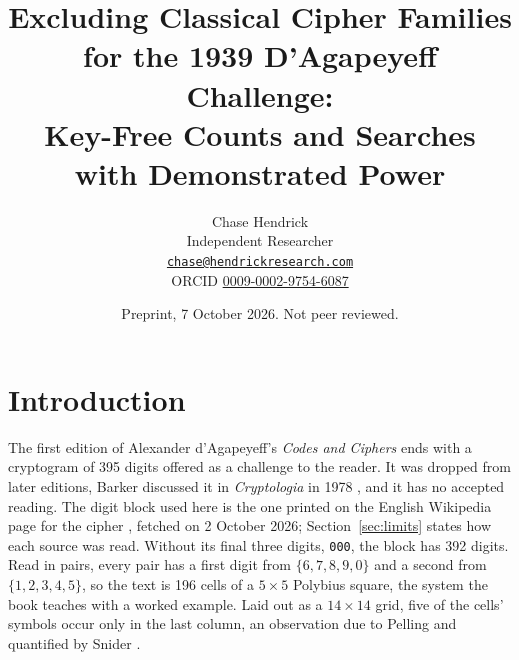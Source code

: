 \documentclass[11pt]{article}
\title{\Large\bfseries Excluding Classical Cipher Families\\ for the 1939 D'Agapeyeff Challenge:\\ Key-Free Counts and Searches with Demonstrated Power}
\author{Chase Hendrick\\[0.2em] {\small Independent Researcher}\\ {\small\href{mailto:chase@hendrickresearch.com}{\texttt{chase@hendrickresearch.com}}}\\ {\small ORCID \href{https://orcid.org/0009-0002-9754-6087}{0009-0002-9754-6087}}}
\date{\small Preprint, 7 October 2026. Not peer reviewed.}
\theoremstyle{definition}
\begin{document}
\maketitle

\begin{abstract}

\end{abstract}

\section{Introduction}\label{sec:intro}

The first edition of Alexander d'Agapeyeff's \emph{Codes and Ciphers} \cite{dagapeyeff1939} ends with a cryptogram of 395 digits offered as a challenge to the reader. It was dropped from later editions, Barker discussed it in \emph{Cryptologia} in 1978 \cite{barker1978}, and it has no accepted reading. The digit block used here is the one printed on the English Wikipedia page for the cipher \cite{wikipedia2026}, fetched on 2 October 2026; Section~\ref{sec:limits} states how each source was read. Without its final three digits, \texttt{000}, the block has 392 digits. Read in pairs, every pair has a first digit from $\{6,7,8,9,0\}$ and a second from $\{1,2,3,4,5\}$, so the text is 196 cells of a $5 \times 5$ Polybius square, the system the book teaches with a worked example. Laid out as a $14 \times 14$ grid, five of the cells' symbols occur only in the last column, an observation due to Pelling \cite{pelling2014} and quantified by Snider \cite{snider2026}.
\end{document}
